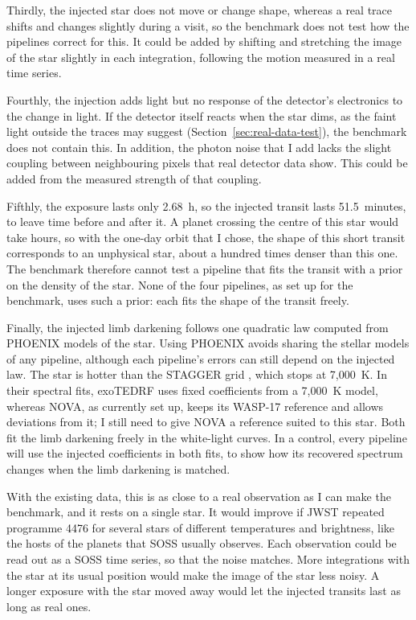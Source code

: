 Thirdly, the injected star does not move or change shape, whereas a real
trace shifts and changes slightly during a visit, so the benchmark does not
test how the pipelines correct for this. It could be added by shifting and
stretching the image of the star slightly in each integration, following the
motion measured in a real time series.

Fourthly, the injection adds light but no response of the detector's
electronics to the change in light. If the detector itself reacts when the star dims, as the faint light outside the traces may suggest (Section~\ref{sec:real-data-test}), the benchmark does not contain this. In addition, the
photon noise that I add lacks the slight coupling between neighbouring pixels that real detector data show. This could be added from the measured strength
of that coupling.

Fifthly, the exposure lasts only 2.68~h, so the injected transit lasts
51.5~minutes, to leave time before and after it. A planet crossing the centre
of this star would take hours, so with the one-day orbit that I chose, the
shape of this short transit corresponds to an unphysical star, about a hundred
times denser than this one. The benchmark therefore cannot test a pipeline that
fits the transit with a prior on the density of the star. None of the four
pipelines, as set up for the benchmark, uses such a prior: each fits the shape
of the transit freely.

Finally, the injected limb darkening follows one quadratic law computed from PHOENIX models of the star. Using PHOENIX avoids sharing the stellar models of any pipeline, although each pipeline's errors can still depend on the injected law. The star is hotter than the STAGGER grid \citep{MagicEtAl2015}, which stops at 7,000~K. In their spectral fits, exoTEDRF uses fixed coefficients from a 7,000~K model, whereas NOVA, as currently set up, keeps its WASP-17 reference and allows deviations from it; I still need to give NOVA a reference suited to this star. Both fit the limb darkening freely in the white-light curves. In a control, every pipeline will use the injected coefficients in both fits, to show how its recovered spectrum changes when the limb darkening is matched.

With the existing data, this is as close to a real observation as I can make
the benchmark, and it rests on a single star. It would improve if JWST
repeated programme 4476 for several stars of different temperatures and
brightness, like the hosts of the planets that SOSS usually observes. Each
observation could be read out as a SOSS time series, so that the noise
matches. More integrations with the star at its usual position would make the
image of the star less noisy. A longer exposure with the star moved away would
let the injected transits last as long as real ones.
